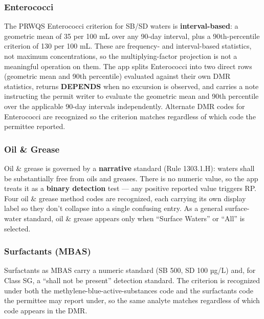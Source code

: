 \documentclass[
  11pt,
  letterpaper,
  DIV=11,
  numbers=noendperiod]{scrartcl}
\begin{document}
\subsubsection{Enterococci}\label{sec-entero}

The PRWQS Enterococci criterion for SB/SD waters is
\textbf{interval-based}: a geometric mean of 35 per 100 mL over any
90-day interval, plus a 90th-percentile criterion of 130 per 100 mL.
These are frequency- and interval-based statistics, not maximum
concentrations, so the multiplying-factor projection is not a meaningful
operation on them. The app splits Enterococci into two direct rows
(geometric mean and 90th percentile) evaluated against their own DMR
statistics, returns \textbf{DEPENDS} when no excursion is observed, and
carries a note instructing the permit writer to evaluate the geometric
mean and 90th percentile over the applicable 90-day intervals
independently. Alternate DMR codes for Enterococci are recognized so the
criterion matches regardless of which code the permittee reported.

\subsubsection{Oil \& Grease}\label{sec-oil}

Oil \& grease is governed by a \textbf{narrative} standard (Rule
1303.1.H): waters shall be substantially free from oils and greases.
There is no numeric value, so the app treats it as a \textbf{binary
detection} test --- any positive reported value triggers RP. Four oil \&
grease method codes are recognized, each carrying its own display label
so they don't collapse into a single confusing entry. As a general
surface-water standard, oil \& grease appears only when ``Surface
Waters'' or ``All'' is selected.

\subsubsection{Surfactants (MBAS)}\label{sec-surfactants}

Surfactants as MBAS carry a numeric standard (SB 500, SD 100 µg/L) and,
for Class SG, a ``shall not be present'' detection standard. The
criterion is recognized under both the methylene-blue-active-substances
code and the surfactants code the permittee may report under, so the
same analyte matches regardless of which code appears in the DMR.
\end{document}
